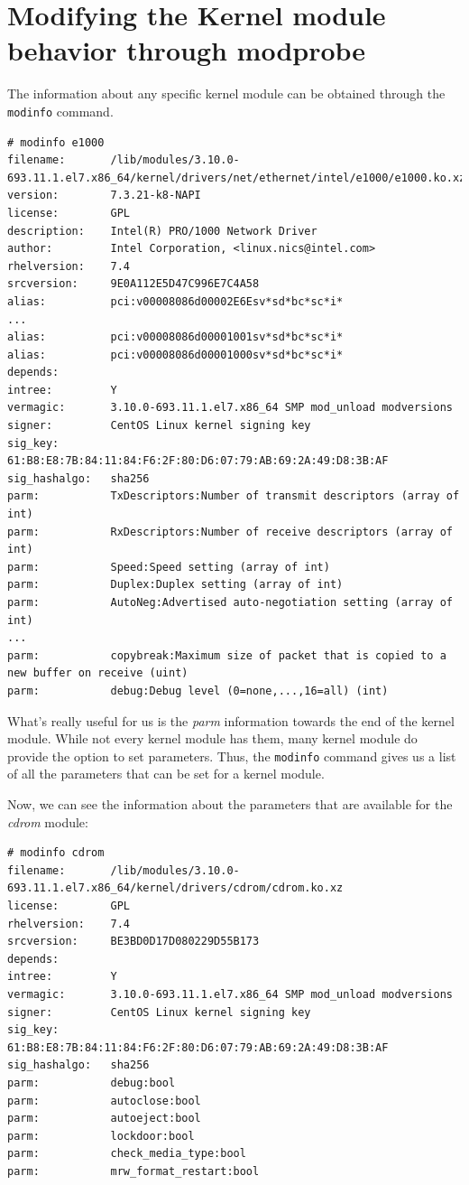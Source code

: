 \section{Modifying the Kernel module behavior through modprobe}
The information about any specific kernel module can be obtained through the \verb|modinfo| command. 

\vspace{-15pt}
\begin{verbatim}
# modinfo e1000
filename:       /lib/modules/3.10.0-693.11.1.el7.x86_64/kernel/drivers/net/ethernet/intel/e1000/e1000.ko.xz
version:        7.3.21-k8-NAPI
license:        GPL
description:    Intel(R) PRO/1000 Network Driver
author:         Intel Corporation, <linux.nics@intel.com>
rhelversion:    7.4
srcversion:     9E0A112E5D47C996E7C4A58
alias:          pci:v00008086d00002E6Esv*sd*bc*sc*i*
...
alias:          pci:v00008086d00001001sv*sd*bc*sc*i*
alias:          pci:v00008086d00001000sv*sd*bc*sc*i*
depends:        
intree:         Y
vermagic:       3.10.0-693.11.1.el7.x86_64 SMP mod_unload modversions 
signer:         CentOS Linux kernel signing key
sig_key:        61:B8:E8:7B:84:11:84:F6:2F:80:D6:07:79:AB:69:2A:49:D8:3B:AF
sig_hashalgo:   sha256
parm:           TxDescriptors:Number of transmit descriptors (array of int)
parm:           RxDescriptors:Number of receive descriptors (array of int)
parm:           Speed:Speed setting (array of int)
parm:           Duplex:Duplex setting (array of int)
parm:           AutoNeg:Advertised auto-negotiation setting (array of int)
...
parm:           copybreak:Maximum size of packet that is copied to a new buffer on receive (uint)
parm:           debug:Debug level (0=none,...,16=all) (int)
\end{verbatim}
\vspace{-10pt}

\noindent
What's really useful for us is the \textit{parm} information towards the end of the kernel module. While not every kernel module has them, many kernel module do provide the option to set parameters. Thus, the \verb|modinfo| command gives us a list of all the parameters that can be set for a kernel module. 

Now, we can see the information about the parameters that are available for the \textit{cdrom} module:

\vspace{-15pt}
\begin{verbatim}
# modinfo cdrom
filename:       /lib/modules/3.10.0-693.11.1.el7.x86_64/kernel/drivers/cdrom/cdrom.ko.xz
license:        GPL
rhelversion:    7.4
srcversion:     BE3BD0D17D080229D55B173
depends:        
intree:         Y
vermagic:       3.10.0-693.11.1.el7.x86_64 SMP mod_unload modversions 
signer:         CentOS Linux kernel signing key
sig_key:        61:B8:E8:7B:84:11:84:F6:2F:80:D6:07:79:AB:69:2A:49:D8:3B:AF
sig_hashalgo:   sha256
parm:           debug:bool
parm:           autoclose:bool
parm:           autoeject:bool
parm:           lockdoor:bool
parm:           check_media_type:bool
parm:           mrw_format_restart:bool
\end{verbatim}
\vspace{-10pt}

